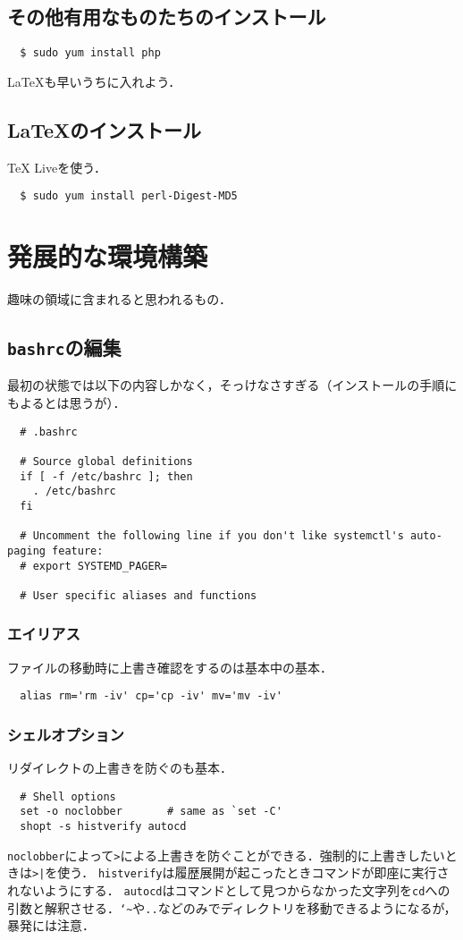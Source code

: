 \documentclass[a4paper]{jsarticle}
\begin{document}
\subsection{その他有用なものたちのインストール}
\begin{lstlisting}
  $ sudo yum install php
\end{lstlisting}
\LaTeX{}も早いうちに入れよう．

\subsection{\LaTeX{}のインストール}
\TeX{} Liveを使う．
\begin{lstlisting}
  $ sudo yum install perl-Digest-MD5
\end{lstlisting}

\section{発展的な環境構築}
趣味の領域に含まれると思われるもの．

\subsection{\texttt{bashrc}の編集}
最初の状態では以下の内容しかなく，そっけなさすぎる（インストールの手順にもよるとは思うが）．
\begin{lstlisting}
  # .bashrc
  
  # Source global definitions
  if [ -f /etc/bashrc ]; then
  	. /etc/bashrc
  fi
  
  # Uncomment the following line if you don't like systemctl's auto-paging feature:
  # export SYSTEMD_PAGER=
  
  # User specific aliases and functions
\end{lstlisting}

\subsubsection{エイリアス}
ファイルの移動時に上書き確認をするのは基本中の基本．
\begin{lstlisting}
  alias rm='rm -iv' cp='cp -iv' mv='mv -iv'
\end{lstlisting}

\subsubsection{シェルオプション}
リダイレクトの上書きを防ぐのも基本．
\begin{lstlisting}
  # Shell options
  set -o noclobber       # same as `set -C'
  shopt -s histverify autocd
\end{lstlisting}
\texttt{noclobber}によって\texttt{>}による上書きを防ぐことができる．強制的に上書きしたいときは\texttt{>|}を使う．
\texttt{histverify}は履歴展開が起こったときコマンドが即座に実行されないようにする．
\texttt{autocd}はコマンドとして見つからなかった文字列を\texttt{cd}への引数と解釈させる．\texttt{\char`\~{}}や\texttt{..}などのみでディレクトリを移動できるようになるが，暴発には注意．
\end{document}
